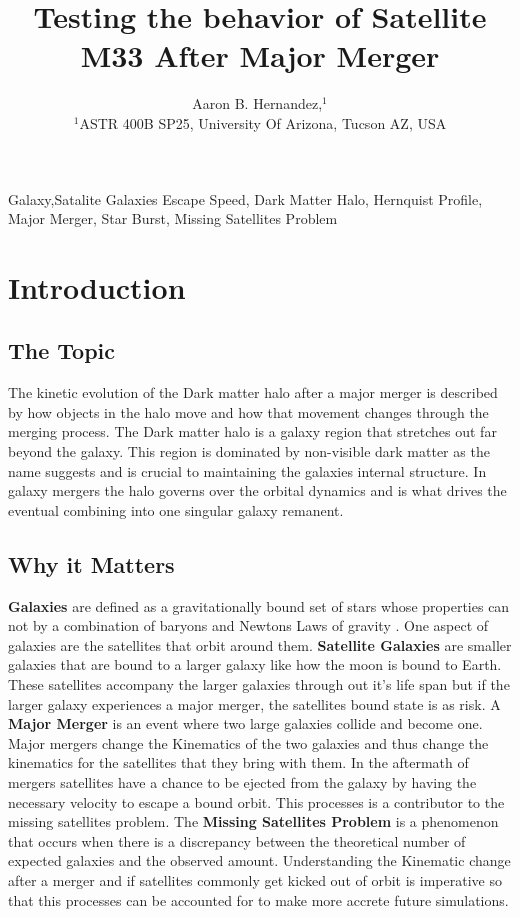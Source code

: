 \documentclass[fleqn,usenatbib]{mnras}
\title[]{Testing the behavior of Satellite M33 After Major Merger}
\author[Aaron B. Hernandez et al.]{
Aaron B. Hernandez,$^{1}$
\\
$^{1}$ASTR 400B SP25, University Of Arizona, Tucson AZ, USA\\
}
\begin{document}
\label{firstpage}
\pagerange{\pageref{firstpage}--\pageref{lastpage}}
\maketitle

\begin{keywords}
Galaxy,Satalite Galaxies Escape Speed, Dark Matter Halo, Hernquist Profile, Major Merger, Star Burst, Missing Satellites Problem
\end{keywords}
\section{Introduction}
\subsection{The Topic}
The kinetic evolution of the Dark matter halo after a major merger is described by how objects in the halo move and how that movement changes through the merging process. The Dark matter halo is a galaxy region that stretches out far beyond the galaxy. This region is dominated by non-visible dark matter as the name suggests and is crucial to maintaining the galaxies internal structure. In galaxy mergers the halo governs over the orbital dynamics and is what drives the eventual combining into one singular galaxy remanent.  
\subsection{Why it Matters}
\textbf{Galaxies} are defined as a gravitationally bound set of stars whose properties can not by a combination of baryons and Newtons Laws of gravity \cite{Willman_Strader2012}. One aspect of galaxies are the satellites that orbit around them. \textbf{Satellite Galaxies} are smaller galaxies that are bound to a larger galaxy like how the moon is bound to Earth. These satellites accompany the larger galaxies through out it's life span but if the larger galaxy experiences a major merger, the satellites bound state is as risk. A \textbf{Major Merger} is an event where two large galaxies collide and become one. Major mergers change the Kinematics of the two galaxies and thus change the kinematics for the satellites that they bring with them. In the aftermath of mergers satellites have a chance to be ejected from the galaxy by having the necessary velocity to escape a bound orbit. This processes is a contributor to the missing satellites problem. The \textbf{Missing Satellites Problem} is a phenomenon that occurs when there is a discrepancy between the theoretical number of expected galaxies and the observed amount. Understanding the Kinematic change after a merger and if satellites commonly get kicked out of orbit is imperative so that this processes can be accounted for to make more accrete future simulations. 
\end{document}
